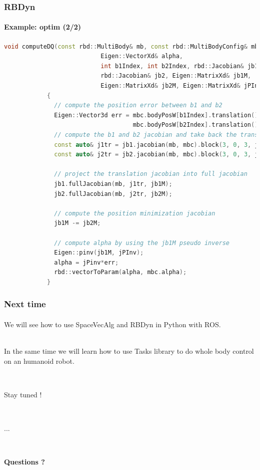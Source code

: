 \documentclass{beamer}
\begin{document}
	\begin{frame}[fragile]
		\frametitle{RBDyn}
		\framesubtitle{Example: optim (2/2)}
		\begin{lstlisting}[language=C++,basicstyle=\tiny]
			void computeDQ(const rbd::MultiBody& mb, const rbd::MultiBodyConfig& mbc,
			               Eigen::VectorXd& alpha,
			               int b1Index, int b2Index, rbd::Jacobian& jb1,
			               rbd::Jacobian& jb2, Eigen::MatrixXd& jb1M,
			               Eigen::MatrixXd& jb2M, Eigen::MatrixXd& jPInv)
			{
			  // compute the position error between b1 and b2
			  Eigen::Vector3d err = mbc.bodyPosW[b1Index].translation() -
			                        mbc.bodyPosW[b2Index].translation();
			  // compute the b1 and b2 jacobian and take back the translation part
			  const auto& j1tr = jb1.jacobian(mb, mbc).block(3, 0, 3, jb1.dof());
			  const auto& j2tr = jb2.jacobian(mb, mbc).block(3, 0, 3, jb2.dof());

			  // project the translation jacobian into full jacobian
			  jb1.fullJacobian(mb, j1tr, jb1M);
			  jb2.fullJacobian(mb, j2tr, jb2M);

			  // compute the position minimization jacobian
			  jb1M -= jb2M;

			  // compute alpha by using the jb1M pseudo inverse
			  Eigen::pinv(jb1M, jPInv);
			  alpha = jPinv*err;
			  rbd::vectorToParam(alpha, mbc.alpha);
			}
		\end{lstlisting}
	\end{frame}

	\begin{frame}
		\frametitle{Next time}
		\framesubtitle{}
		We will see how to use SpaceVecAlg and RBDyn in Python with ROS.
		
		\hfill \\
		In the same time we will learn how to use Tasks library to do whole body control on an humanoid robot.

		\hfill \\
		{\centering
		Stay tuned !\par}
		\hfil \\
		{\centering
		...\par}
		\hfill \\
		{\centering
		\bf{Questions} ?\par}
	\end{frame}
\end{document}
